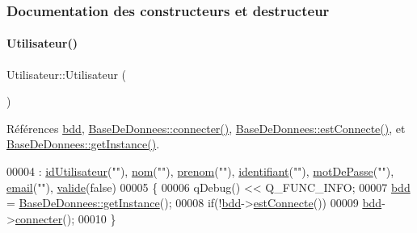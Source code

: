\subsubsection{Documentation des constructeurs et destructeur}
\mbox{\label{class_utilisateur_ae76433a6d353c5f5ad0c6a6af64022ad}} 
\paragraph{\texorpdfstring{Utilisateur()}{Utilisateur()}\hspace{0.1cm}{\footnotesize\ttfamily [1/2]}}
{\footnotesize\ttfamily Utilisateur\+::\+Utilisateur (\begin{DoxyParamCaption}{ }\end{DoxyParamCaption})}



Références \hyperlink{class_utilisateur_a94fa14e95bd90358fb67eca0170e1724}{bdd}, \hyperlink{class_base_de_donnees_ac20da193923a9bfea5e38ee5a54820cd}{Base\+De\+Donnees\+::connecter()}, \hyperlink{class_base_de_donnees_a00388973f3ec42e5c8e76e7af7e124b2}{Base\+De\+Donnees\+::est\+Connecte()}, et \hyperlink{class_base_de_donnees_a80028aa2b6b4fbf30fb2e36357b7d3d3}{Base\+De\+Donnees\+::get\+Instance()}.


\begin{DoxyCode}
00004                          : \hyperlink{class_utilisateur_ae1763e7a52c82c63506bc4160cdabb20}{idUtilisateur}(\textcolor{stringliteral}{""}), \hyperlink{class_utilisateur_a1096e809aca4b7cf453a7af93cb72502}{nom}(\textcolor{stringliteral}{""}), \hyperlink{class_utilisateur_a1dd0779807b19298f30f39d9c371170f}{prenom}(\textcolor{stringliteral}{""}), 
      \hyperlink{class_utilisateur_a1e79e47202a2c716346f47adbbeb2511}{identifiant}(\textcolor{stringliteral}{""}), \hyperlink{class_utilisateur_a4f6a17d0fb5c231bcb414396236a056f}{motDePasse}(\textcolor{stringliteral}{""}), \hyperlink{class_utilisateur_a2f45443ce5277a5e6baefe5121e66555}{email}(\textcolor{stringliteral}{""}), \hyperlink{class_utilisateur_ad8b12c53bc07491a54895d48631ef6a2}{valide}(\textcolor{keyword}{false})
00005 \{
00006     qDebug() << Q\_FUNC\_INFO;
00007     \hyperlink{class_utilisateur_a94fa14e95bd90358fb67eca0170e1724}{bdd} = \hyperlink{class_base_de_donnees_a80028aa2b6b4fbf30fb2e36357b7d3d3}{BaseDeDonnees::getInstance}();
00008     \textcolor{keywordflow}{if}(!\hyperlink{class_utilisateur_a94fa14e95bd90358fb67eca0170e1724}{bdd}->\hyperlink{class_base_de_donnees_a00388973f3ec42e5c8e76e7af7e124b2}{estConnecte}())
00009         \hyperlink{class_utilisateur_a94fa14e95bd90358fb67eca0170e1724}{bdd}->\hyperlink{class_base_de_donnees_ac20da193923a9bfea5e38ee5a54820cd}{connecter}();
00010 \}
\end{DoxyCode}
\mbox{\label{class_utilisateur_aa11337e30b95db151312f65201c61199}} 

